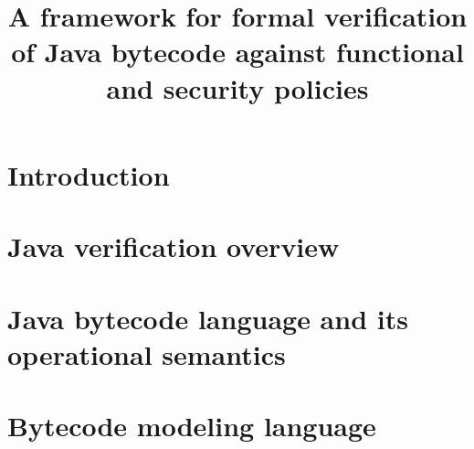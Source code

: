 \documentclass[book,10pt]{book}
\title{ A framework for formal verification of Java bytecode against  functional and security policies}
\begin{document}
    \lstset{language=Jml}
    \lstset{frameround=tttt}

    \renewcommand{\topfraction}{0.9}
    \renewcommand{\textfraction}{0.05}
    \renewcommand{\floatpagefraction}{0.75}

\maketitle
\tableofcontents


\chapter{Introduction}
    
 
\chapter{Java verification overview}\label{javaVerif}
   
   
   
%   
   
   	
   
   
   
\chapter{Java bytecode language and its operational semantics} \label{opSem:prelim}
     
   
   
   
   
   
   
   
   
   
   
  
   
  
   

\chapter{Bytecode modeling language} \label{bcsl}
  \lstset{numbers=left,numberstyle=\small,stepnumber=1,numbersep=5pt}
   
  
  
  
  
  
\end{document}
